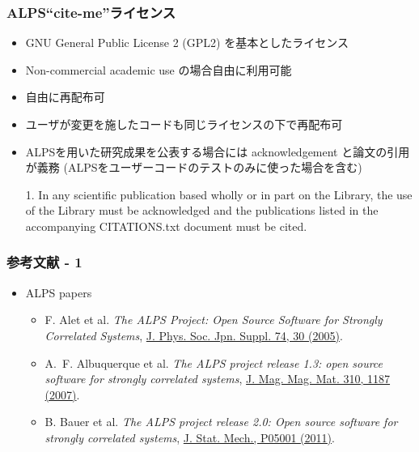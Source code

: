 \begin{frame}
\frametitle{ALPS``cite-me''ライセンス}
  \begin{itemize}
  \item GNU General Public License 2 (GPL2) を基本としたライセンス
  \item Non-commercial academic use の場合自由に利用可能
  \item 自由に再配布可
  \item ユーザが変更を施したコードも同じライセンスの下で再配布可
  \item ALPSを用いた研究成果を公表する場合には acknowledgement と論文の引用が義務 (ALPSをユーザーコードのテストのみに使った場合を含む)
    \begin{minipage}{.9\textwidth}
    \begin{block}{}
      1. In any scientific publication based wholly or in part on the
      Library, the use of the Library must be acknowledged and the
      publications listed in the accompanying CITATIONS.txt document
      must be cited.
    \end{block}
    \end{minipage}
  \end{itemize}
\end{frame}

\begin{frame}
  \frametitle{参考文献 - 1}
  \begin{itemize}
  \item ALPS papers
    \begin{itemize}
    \item F. Alet et al. {\it The ALPS Project: Open Source Software for
      Strongly Correlated Systems}, \href{http://jpsj.ipap.jp/link?JPSJS/74S/30}{J. Phys. Soc. Jpn. Suppl. 74, 30 (2005)}.
    \item A.~F. Albuquerque et al. {\it The ALPS project release 1.3: open source software for strongly correlated systems}, \href{http://dx.doi.org/10.1016/j.jmmm.2006.10.304}{J. Mag. Mag. Mat. 310, 1187 (2007)}.
    \item B. Bauer et al. {\it The ALPS project release 2.0: Open source software for strongly correlated systems}, \href{http://iopscience.iop.org/1742-5468/2011/05/P05001}{J. Stat. Mech., P05001 (2011)}.
    \end{itemize}
  \end{itemize}
\end{frame}

